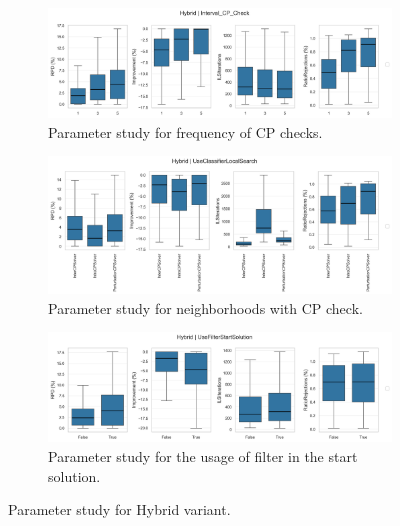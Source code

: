 \begin{figure}[!ht]
	\centering
	\begin{subfigure}[t]{\textwidth}
		\centering
		\includegraphics[width=\linewidth]{pictures/parameter_study/Interval_CP_Check_Hybrid_parameter_study.png}
		\caption{Parameter study for frequency of CP checks.}
	\end{subfigure}
	\begin{subfigure}[t]{\textwidth}
		\centering
		\includegraphics[width=\linewidth]{pictures/parameter_study/UseClassifierLocalSearch_Hybrid_parameter_study.png}
		\caption{Parameter study for neighborhoods with CP check.}
	\end{subfigure}
	\begin{subfigure}[t]{\textwidth}
		\centering
		\includegraphics[width=\linewidth]{pictures/parameter_study/UseFilterStartSolution_Hybrid_parameter_study.png}
		\caption{Parameter study for the usage of filter in the start solution.}
	\end{subfigure}
	\caption{Parameter study for Hybrid variant.}
\end{figure}
\clearpage
